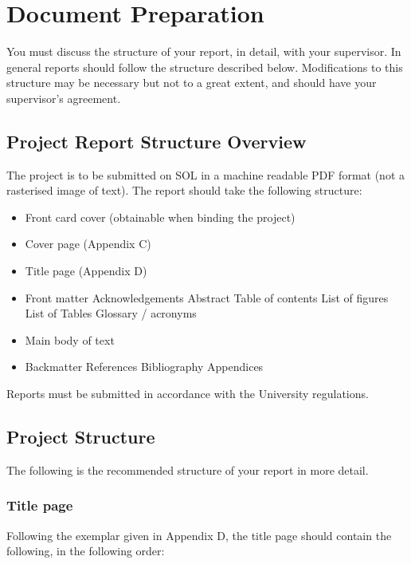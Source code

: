 \chapter{Document Preparation}

You must discuss the structure of your report, in detail, with your supervisor. In general reports should follow the structure described below. Modifications to this structure may be necessary but not to a great extent, and should have your supervisor’s agreement.

\section{Project Report Structure Overview}

The project is to be submitted on SOL in a machine readable PDF format (not a rasterised image of text). The report should take the following structure:

\begin{itemize}
    \item Front card cover (obtainable when binding the project)
    \item Cover page (Appendix C)
    \item Title page (Appendix D)
    \item Front matter
    \subitem Acknowledgements
    \subitem Abstract
    \subitem Table of contents
    \subitem List of figures
    \subitem List of Tables
    \subitem Glossary / acronyms
    \item Main body of text
    \item Backmatter
    \subitem References
    \subitem Bibliography
    \subitem Appendices  
\end{itemize}

Reports must be submitted in accordance with the University regulations.

\section{Project Structure}

The following is the recommended structure of your report in more detail.

\subsection{Title page}

Following the exemplar given in Appendix D, the title page should contain the following, in the following order:

